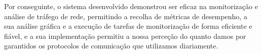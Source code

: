 \documentclass[a4paper,12pt]{scrreprt}
\begin{document}
Por conseguinte, o sistema desenvolvido demonstrou ser eficaz na monitorização e
análise de tráfego de rede, permitindo a recolha de métricas de
desempenho, a sua análise gráfica e a execução de tarefas de monitorização de forma
eficiente e fiável, e a sua implementação permitiu a nossa perceção do quanto damos por garantidos
os protocolos de comunicação que utilizamos diariamente.






%

\end{document}
